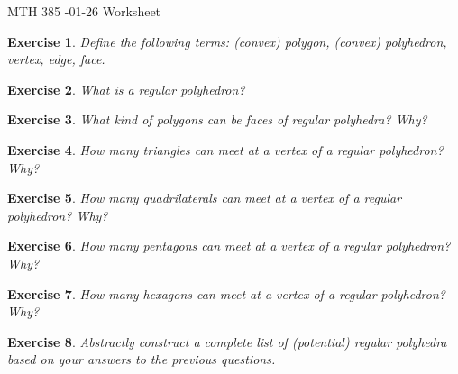 \documentclass[12pt]{article}
\theoremstyle{plain}
\newtheorem{ex}{Exercise}
\begin{document}
MTH 385 -01-26 Worksheet

\begin{ex}
  Define the following terms: (convex) polygon, (convex) polyhedron, vertex, edge, face.
\end{ex}

\begin{ex}
  What is a \emph{regular polyhedron}?
\end{ex}

\begin{ex}
  What kind of polygons can be faces of regular polyhedra? Why?
\end{ex}

\begin{ex}
  How many triangles can meet at a vertex of a regular polyhedron? Why?
\end{ex}

\begin{ex}
  How many quadrilaterals can meet at a vertex of a regular polyhedron? Why?
\end{ex}

\begin{ex}
  How many pentagons can meet at a vertex of a regular polyhedron? Why?
\end{ex}

\begin{ex}
  How many hexagons can meet at a vertex of a regular polyhedron? Why?
\end{ex}

\begin{ex}
  Abstractly construct a complete list of (potential) regular polyhedra based on your answers to the previous questions.
\end{ex}
\end{document}

